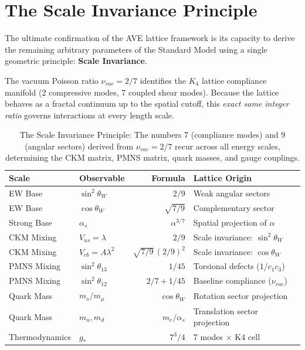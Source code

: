 \section{The Scale Invariance Principle}
\label{sec:scale_invariance}

The ultimate confirmation of the AVE lattice framework is its capacity
to derive the remaining arbitrary parameters of the Standard Model using
a single geometric principle: \textbf{Scale Invariance}.

The vacuum Poisson ratio $\nu_{vac} = 2/7$ identifies the $K_4$
lattice compliance manifold (2 compressive modes, 7 coupled shear modes).
Because the lattice behaves as a fractal continuum up to the spatial
cutoff, this \emph{exact same integer ratio} governs interactions at
every length scale.

\begin{table}[h]
\centering
\small
\begin{tabular}{llrl}
\toprule
\textbf{Scale} & \textbf{Observable} & \textbf{Formula} & \textbf{Lattice Origin} \\
\midrule
EW Base     & $\sin^2\theta_W$ & $2/9$ & Weak angular sectors \\
EW Base     & $\cos\theta_W$ & $\sqrt{7/9}$ & Complementary sector \\
Strong Base & $\alpha_s$ & $\alpha^{3/7}$ & Spatial projection of $\alpha$ \\
CKM Mixing  & $V_{us} = \lambda$ & $2/9$ & Scale invariance: $\sin^2\theta_W$ \\
CKM Mixing  & $V_{cb} = A\lambda^2$ & $\sqrt{7/9}\,(2/9)^2$ & Scale invariance: $\cos\theta_W$ \\
PMNS Mixing & $\sin^2\theta_{13}$ & $1/45$ & Torsional defects ($1/c_1c_3$) \\
PMNS Mixing & $\sin^2\theta_{12}$ & $2/7 + 1/45$ & Baseline compliance ($\nu_{vac}$) \\
Quark Mass  & $m_s / m_\mu$ & $\cos\theta_W$ & Rotation sector projection \\
Quark Mass  & $m_u, m_d$ & $m_e/\alpha_s$ & Translation sector projection \\
Thermodynamics & $g_*$ & $7^3/4$ & 7 modes $\times$ K4 cell \\
\bottomrule
\end{tabular}
\caption{The Scale Invariance Principle: The numbers 7 (compliance modes)
and 9 (angular sectors) derived from $\nu_{vac} = 2/7$ recur across
all energy scales, determining the CKM matrix, PMNS matrix, quark
masses, and gauge couplings.}
\label{tab:scale_invariance}
\end{table}

